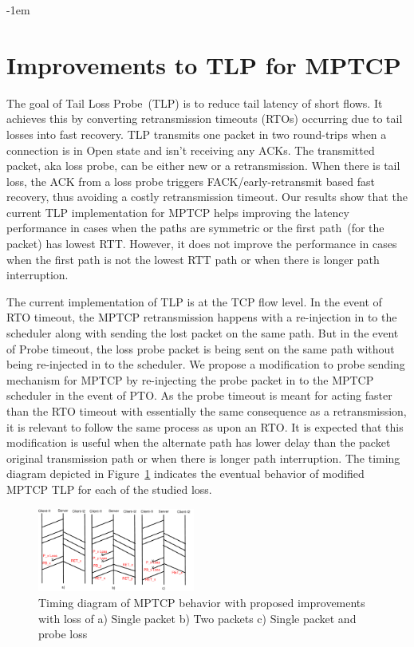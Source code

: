 \documentclass[10pt,conference,compsoc]{IEEEtran}
\begin{document}
\kern-1em
\section{Improvements to TLP for MPTCP}\label{impr}
The goal of Tail Loss Probe~(TLP) is to reduce tail latency of short flows. It achieves this by converting retransmission timeouts (RTOs) occurring due to tail losses into fast recovery. TLP transmits one packet in two round-trips when a connection is in Open state and isn't receiving any ACKs. The transmitted packet, aka loss probe, can be either new or a retransmission. When there is tail loss, the ACK from a loss probe triggers FACK/early-retransmit based fast recovery, thus avoiding a costly retransmission timeout. Our results show that the current TLP implementation for MPTCP helps improving the latency performance in cases when the paths are symmetric or the first path~(for the packet) has lowest RTT. However, it does not improve the performance in cases when the first path is not the lowest RTT path or when there is longer path interruption.

The current implementation of TLP is at the TCP flow level. In the event of RTO timeout, the MPTCP retransmission happens with a re-injection in to the scheduler along with sending the lost packet on the same path. But in the event of Probe timeout, the loss probe packet is being sent on the same path without being re-injected in to the scheduler. We propose a modification to probe sending mechanism for MPTCP by re-injecting the probe packet in to the MPTCP scheduler in the event of PTO. As the probe timeout is meant for acting faster than the RTO timeout with essentially the same consequence as a retransmission, it is relevant to follow the same process as upon an RTO. It is expected that this modification is useful when the alternate path has lower delay than the packet original transmission path or when there is longer path interruption. The timing diagram depicted in Figure~\ref{timingNew} indicates the eventual behavior of modified MPTCP TLP for each of the studied loss. 

\begin{figure}[!ht]
\begin{center}
\includegraphics[angle=0, width=0.46\textwidth]{images/timingER3NewTLP1.pdf}
\end{center}
\caption{Timing diagram of MPTCP behavior with proposed improvements with loss of a) Single packet b) Two packets c) Single packet and probe loss}\label{timingNew}
\end{figure}
\end{document}
